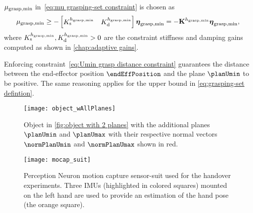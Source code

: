 		 $\mu_{\rm \rm grasp,\min}$ in~\eqref{eq:mu grasping-set constraint} is chosen as 
		\begin{equation}\label{eq:Umin grasp distance constraint}
			\mu_{\rm \rm grasp,\min} \geq -\begin{bmatrix}
				K_{\rm s}^{	h_{\rm grasp,\min}}& K_{\rm d}^{	h_{\rm grasp,\min}}
			\end{bmatrix}\boldsymbol{\eta}_{\rm grasp,\min} = -\mathbf{K}^{h_{\rm grasp,\min}}\boldsymbol{\eta}_{\rm grasp,\min},
		\end{equation}
		where $K_{\rm s}^{h_{\rm grasp,\min}}, K_{\rm d}^{h_{\rm grasp,\min}}>0$ are the constraint stiffness and damping gains computed as shown in \cref{chap:adaptive gains}. 
		
		Enforcing constraint~\eqref{eq:Umin grasp distance constraint} guarantees the distance between the end-effector position $\endEffPosition$ and the plane $\planUmin$ to be positive. The same reasoning applies for the upper bound in \cref{eq:grasping-set defintion}. 
		
	
%		
\begin{figure}
	\centering
	\texttt{[image: object\_wAllPlanes]}
	\caption{Object in \cref{fig:object with 2 planes} with the additional planes $\planUmin$ and $\planUmax$ with their respective normal vectors $\normPlanUmin$ and $\normPlanUmax$ shown in red.}
	\label{fig:object with 3 planes}
\end{figure}
\begin{figure}
	\centering
	\texttt{[image: mocap\_suit]}
	\caption{Perception Neuron motion capture sensor-suit used for the handover experiments. Three IMUs (highlighted in colored squares) mounted on the left hand are used to provide an estimation of the hand pose (the orange square). }
	\label{fig:mocap_suit}
\end{figure}

